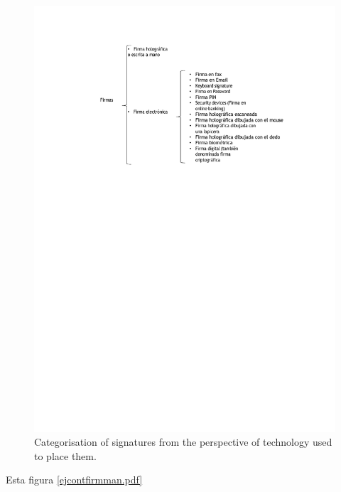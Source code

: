 \documentclass[12pt]{report} %
\begin{document}
\begin{itemize}
\begin{figure}
\centering
\includegraphics[width=0.85\columnwidth]{imagenes/cuadrollavefirmas.pdf}
\caption{Categorisation of signatures from the perspective of technology used to place them.}
\label{vusftollsbrgitmsd.pdf}
\end{figure} 


Esta figura \ref{ejcontfirmman.pdf}



\end{itemize}
\end{document}
